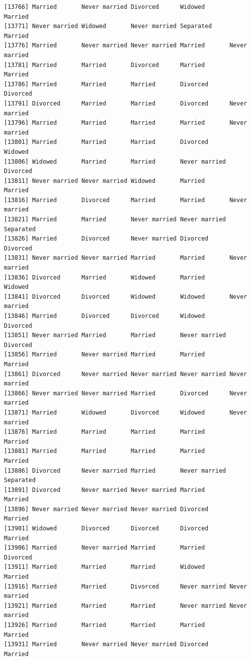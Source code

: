 \documentclass[
  letterpaper,
  DIV=11,
  numbers=noendperiod,
  oneside]{scrartcl}
\begin{document}
\begin{verbatim}
[13766] Married       Never married Divorced      Widowed       Married      
[13771] Never married Widowed       Never married Separated     Married      
[13776] Married       Never married Never married Married       Never married
[13781] Married       Married       Divorced      Married       Married      
[13786] Married       Married       Married       Divorced      Divorced     
[13791] Divorced      Married       Married       Divorced      Never married
[13796] Married       Married       Married       Married       Never married
[13801] Married       Married       Married       Divorced      Widowed      
[13806] Widowed       Married       Married       Never married Divorced     
[13811] Never married Never married Widowed       Married       Married      
[13816] Married       Divorced      Married       Married       Never married
[13821] Married       Married       Never married Never married Separated    
[13826] Married       Divorced      Never married Divorced      Divorced     
[13831] Never married Never married Married       Married       Never married
[13836] Divorced      Married       Widowed       Married       Widowed      
[13841] Divorced      Divorced      Widowed       Widowed       Never married
[13846] Married       Divorced      Divorced      Widowed       Divorced     
[13851] Never married Married       Married       Never married Divorced     
[13856] Married       Never married Married       Married       Married      
[13861] Divorced      Never married Never married Never married Never married
[13866] Never married Never married Married       Divorced      Never married
[13871] Married       Widowed       Divorced      Widowed       Never married
[13876] Married       Married       Married       Married       Married      
[13881] Married       Married       Married       Married       Married      
[13886] Divorced      Never married Married       Never married Separated    
[13891] Divorced      Never married Never married Married       Married      
[13896] Never married Never married Never married Divorced      Married      
[13901] Widowed       Divorced      Divorced      Divorced      Married      
[13906] Married       Never married Married       Married       Divorced     
[13911] Married       Married       Married       Widowed       Married      
[13916] Married       Married       Divorced      Never married Never married
[13921] Married       Married       Married       Never married Never married
[13926] Married       Married       Married       Married       Married      
[13931] Married       Never married Never married Divorced      Married      

\end{verbatim}
\end{document}
